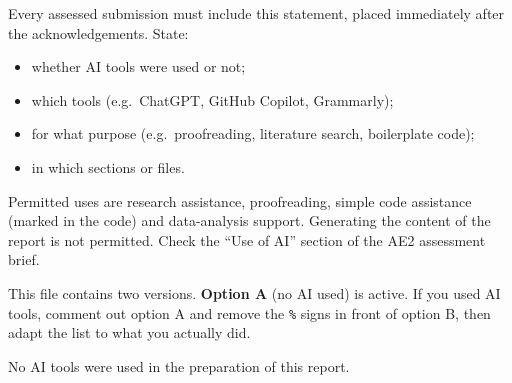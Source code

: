 
\begin{guidance}
Every assessed submission must include this statement, placed immediately
after the acknowledgements. State:
\begin{itemize}
  \item whether AI tools were used or not;
  \item which tools (e.g.\ ChatGPT, GitHub Copilot, Grammarly);
  \item for what purpose (e.g.\ proofreading, literature search, boilerplate code);
  \item in which sections or files.
\end{itemize}
Permitted uses are research assistance, proofreading, simple code
assistance (marked in the code) and data-analysis support. Generating the
content of the report is not permitted. Check the \enquote{Use of AI}
section of the AE2 assessment brief.

This file contains two versions. \textbf{Option A} (no AI used) is active.
If you used AI tools, comment out option A and remove the \texttt{\%} signs
in front of option B, then adapt the list to what you actually did.
\end{guidance}

No AI tools were used in the preparation of this report.

